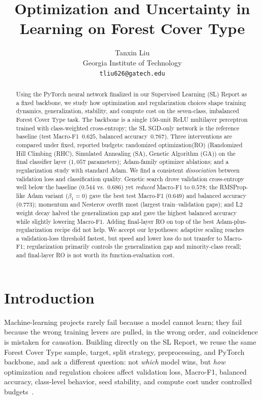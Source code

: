 \documentclass[letterpaper, 10pt, conference]{ieeeconf}
\title{\LARGE \bf Optimization and Uncertainty in Learning on Forest Cover Type}
\author{Tanxin Liu\\
  Georgia Institute of Technology\\
  \texttt{tliu626@gatech.edu}}
\begin{document}
\maketitle
\thispagestyle{empty}
\pagestyle{empty}

\begin{abstract}
Using the PyTorch neural network finalized in our Supervised Learning (SL)
Report as a fixed backbone, we study how optimization and regularization choices
shape training dynamics, generalization, stability, and compute cost on the
seven-class, imbalanced Forest Cover Type task. The backbone is a single
$150$-unit ReLU multilayer perceptron trained with class-weighted cross-entropy;
the SL SGD-only network is the reference baseline (test Macro-F1~$0.625$,
balanced accuracy~$0.767$). Three interventions are compared under fixed,
reported budgets: randomized optimization(RO) (Randomized Hill Climbing (RHC), Simulated Annealing (SA), Genetic Algorithm (GA)) on the final classifier
layer ($1{,}057$ parameters); Adam-family optimizer ablations; and a
regularization study with standard Adam. We find a consistent \emph{dissociation}
between validation loss and classification quality. Genetic search drove
validation cross-entropy well below the baseline ($0.544$ vs.\ $0.686$) yet
\emph{reduced} Macro-F1 to $0.578$; the RMSProp-like Adam variant
($\beta_1{=}0$) gave the best test Macro-F1 ($0.649$) and balanced accuracy
($0.773$); momentum and Nesterov overfit most (largest train--validation gaps);
and L2 weight decay halved the generalization gap and gave the highest balanced
accuracy while slightly lowering Macro-F1. Adding final-layer RO on top of the
best Adam-plus-regularization recipe did not help. We accept our hypotheses:
adaptive scaling reaches a validation-loss threshold fastest, but speed and
lower loss do not transfer to Macro-F1; regularization primarily controls the
generalization gap and minority-class recall; and final-layer RO is not worth
its function-evaluation cost.
\end{abstract}

\section{Introduction}
\label{sec:intro}

Machine-learning projects rarely fail because a model cannot learn; they fail
because the wrong training levers are pulled, in the wrong order, and coincidence
is mistaken for causation. Building directly on the SL Report, we
reuse the same Forest Cover Type sample, target, split strategy, preprocessing,
and PyTorch backbone, and ask a different question: not \emph{which} model wins,
but \emph{how} optimization and regulation choices affect validation loss, Macro-F1,
balanced accuracy, class-level behavior, seed stability, and compute cost under
controlled budgets~\cite{blackard1999}.
\end{document}
